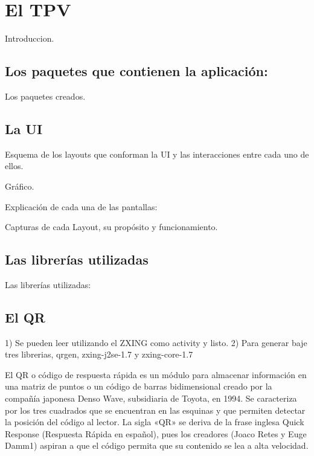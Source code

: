 \chapter{El \acf{TPV}}
\label{cpt:tpv}

Introduccion.

\section{Los paquetes que contienen la aplicaci\'on:}
\label{sec:tpv.packages}

Los paquetes creados.

\section{La \acf{UI}}
\label{sec:tpv.ui}

Esquema de los layouts que conforman la UI y las interacciones entre cada uno de ellos.

Gráfico.

Explicación de cada una de las pantallas:

Capturas de cada Layout, su prop\'osito y funcionamiento.

\section{Las librer\'ias utilizadas}
\label{sec:tpv.libraries}

Las librer\'ias utilizadas:

\section{El \ac{QR}}
\label{sec:tpv.qr}

1) Se pueden leer utilizando el ZXING como activity y listo.
2) Para generar baje tres librerias, qrgen, zxing-j2se-1.7 y zxing-core-1.7

El \ac{QR} o código de respuesta rápida es un módulo para almacenar información en una matriz de puntos o un código de barras bidimensional creado por la compañía japonesa Denso Wave, subsidiaria de Toyota, en 1994. Se caracteriza por los tres cuadrados que se encuentran en las esquinas y que permiten detectar la posición del código al lector. La sigla «QR» se deriva de la frase inglesa Quick Response (Respuesta Rápida en español), pues los creadores (Joaco Retes y Euge Damm1) aspiran a que el código permita que su contenido se lea a alta velocidad.


